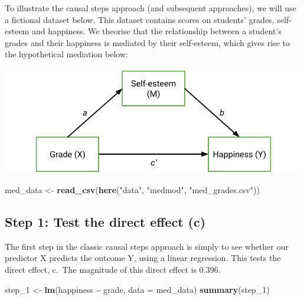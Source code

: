 \documentclass[
]{book}
\newenvironment{Shaded}{\begin{snugshade}}{\end{snugshade}}
\newcommand{\AttributeTok}[1]{\textcolor[rgb]{0.13,0.29,0.53}{#1}}
\newcommand{\FunctionTok}[1]{\textcolor[rgb]{0.13,0.29,0.53}{\textbf{#1}}}
\newcommand{\NormalTok}[1]{#1}
\newcommand{\OtherTok}[1]{\textcolor[rgb]{0.56,0.35,0.01}{#1}}
\newcommand{\SpecialCharTok}[1]{\textcolor[rgb]{0.81,0.36,0.00}{\textbf{#1}}}
\newcommand{\StringTok}[1]{\textcolor[rgb]{0.31,0.60,0.02}{#1}}
\begin{document}
To illustrate the causal steps approach (and subsequent approaches), we will use a fictional dataset below. This dataset contains scores on students' grades, self-esteem and happiness. We theorise that the relationship between a student's grades and their happiness is mediated by their self-esteem, which gives rise to the hypothetical mediation below:

\begin{center}\includegraphics{img/mediation_3} \end{center}

\begin{Shaded}
\begin{Highlighting}[]
\NormalTok{med\_data }\OtherTok{\textless{}{-}} \FunctionTok{read\_csv}\NormalTok{(}\FunctionTok{here}\NormalTok{(}\StringTok{"data"}\NormalTok{, }\StringTok{"medmod"}\NormalTok{, }\StringTok{"med\_grades.csv"}\NormalTok{))}
\end{Highlighting}
\end{Shaded}

\subsection{Step 1: Test the direct effect (c)}\label{step-1-test-the-direct-effect-c}

The first step in the classic causal steps approach is simply to see whether our predictor X predicts the outcome Y, using a linear regression. This tests the direct effect, c.~The magnitude of this direct effect is 0.396.

\begin{Shaded}
\begin{Highlighting}[]
\NormalTok{step\_1 }\OtherTok{\textless{}{-}} \FunctionTok{lm}\NormalTok{(happiness }\SpecialCharTok{\textasciitilde{}}\NormalTok{ grade, }\AttributeTok{data =}\NormalTok{ med\_data)}
\FunctionTok{summary}\NormalTok{(step\_1)}
\end{Highlighting}
\end{Shaded}
\end{document}
